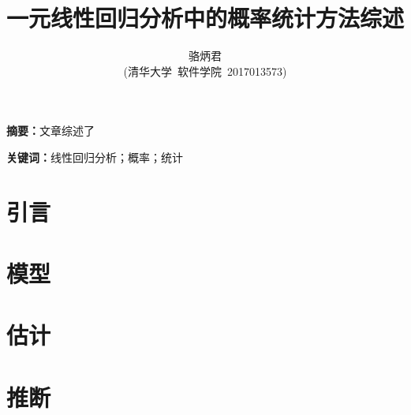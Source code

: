 \documentclass[UTF8]{ctexart}
\title{一元线性回归分析中的概率统计方法综述}
\author{骆炳君\\
    (清华大学\  软件学院\  2017013573)}
\begin{document}
\maketitle
{}

\textbf{摘要：}文章综述了

\textbf{关键词：}线性回归分析；概率；统计

\section{引言}

\section{模型}

\section{估计}

\section{推断}
\end{document}
